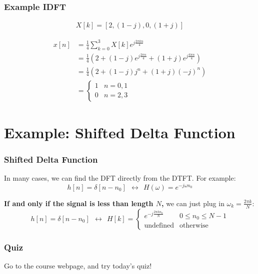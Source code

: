 \documentclass{beamer}
\begin{document}
\begin{frame}
  \frametitle{Example IDFT}
  
  \begin{align*}
    X[k] = [ 2, (1-j), 0, (1+j) ]
  \end{align*}

  \begin{align*}
    x[n] &= \frac{1}{4}\sum_{k=0}^3 X[k]e^{j\frac{2\pi kn}{4}}\\
    &= \frac{1}{4}\left(2+ (1-j)e^{j\frac{2\pi n}{4}}+(1+j)e^{j\frac{6\pi n}{4}}\right)\\
    &= \frac{1}{4}\left(2+ (1-j)j^n +(1+j)(-j)^n\right)\\
    &=\begin{cases}
    1 & n=0,1\\
    0 & n=2,3
    \end{cases}
  \end{align*}
\end{frame}


\section[Delta]{Example: Shifted Delta Function}
\setcounter{subsection}{1}

\begin{frame}
  \frametitle{Shifted Delta Function}

  In many cases, we can find the DFT directly from the DTFT.  For example:
  \begin{displaymath}
    h[n]=\delta[n-n_0] ~~\leftrightarrow~~H(\omega)=e^{-j\omega n_0}
  \end{displaymath}

  {\bf If and only if the signal is less than length $N$,} we can just
  plug in $\omega_k=\frac{2\pi k}{N}$:
  \begin{displaymath}
    h[n]=\delta[n-n_0]~~\leftrightarrow~~
    H[k]=\begin{cases}
    e^{-j\frac{2\pi kn_0}{N}} & 0\le n_0\le N-1\\
    \mbox{undefined} &\mbox{otherwise}
    \end{cases}
  \end{displaymath}
\end{frame}

\begin{frame}
  \frametitle{Quiz}

  Go to the course webpage, and try today's quiz!
\end{frame}
\end{document}

